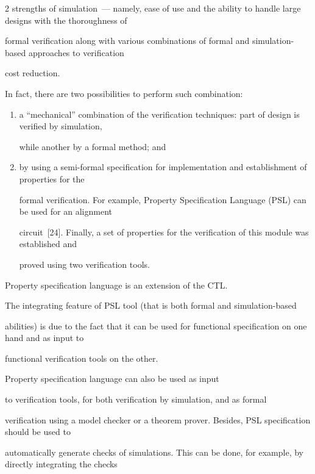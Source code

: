 \begin{multicols}{2}
strengths of simulation~--- namely, ease of use and the ability to handle large designs with the thoroughness of


formal verification along with various combinations of formal and simulation-based approaches to verification


cost reduction.





    In fact, there are two possibilities to perform such combination:


    \begin{enumerate}[(1)]


\item a ``mechanical'' combination of the verification techniques: part of design is verified by simulation,


while another by a formal method; and


\item by using a semi-formal specification for implementation and establishment of properties for the


formal verification. For example, Property Specification Language (PSL) can be used for an alignment


circuit~[24]. Finally, a set of properties for the veri\-fi\-cation of this module was established and


proved using two verification tools.


    \end{enumerate}


    Property specification language is an extension of the CTL.


The integrating feature of PSL tool (that is both formal and simulation-based


abilities) is due to the fact that it can be used for functional specification on one hand and as input to


functional verification tools on the other.





    Property specification language can also be used as input


to verification tools, for both verification by simulation, and as formal


verification using a model checker or a theorem prover. Besides, PSL specification should be used to


automatically generate checks of simulations. This can be done, for example, by directly integrating the checks



\end{multicols}
